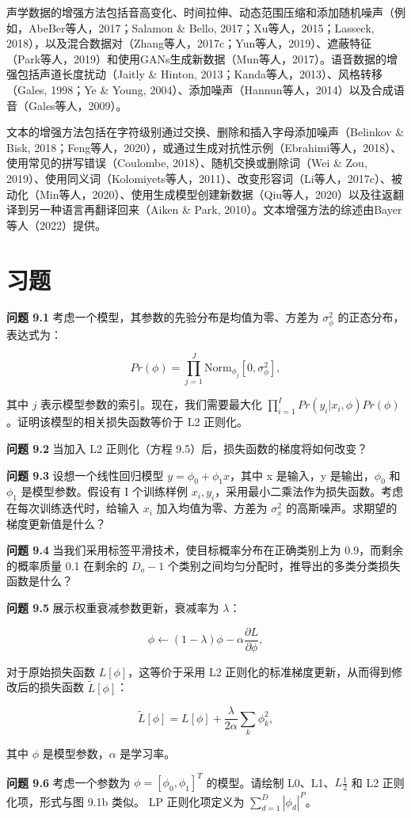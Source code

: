 声学数据的增强方法包括音高变化、时间拉伸、动态范围压缩和添加随机噪声（例如，AbeBer等人，2017；Salamon \& Bello, 2017；Xu等人，2015；Lasseck, 2018），以及混合数据对（Zhang等人，2017c；Yun等人，2019）、遮蔽特征（Park等人，2019）和使用GANs生成新数据（Mun等人，2017）。语音数据的增强包括声道长度扰动（Jaitly \& Hinton, 2013；Kanda等人，2013）、风格转移（Gales, 1998；Ye \& Young, 2004）、添加噪声（Hannun等人，2014）以及合成语音（Gales等人，2009）。

文本的增强方法包括在字符级别通过交换、删除和插入字母添加噪声（Belinkov \& Bisk, 2018；Feng等人，2020），或通过生成对抗性示例（Ebrahimi等人，2018）、使用常见的拼写错误（Coulombe, 2018）、随机交换或删除词（Wei \& Zou, 2019）、使用同义词（Kolomiyets等人，2011）、改变形容词（Li等人，2017c）、被动化（Min等人，2020）、使用生成模型创建新数据（Qiu等人，2020）以及往返翻译到另一种语言再翻译回来（Aiken \& Park, 2010）。文本增强方法的综述由Bayer等人（2022）提供。

\section{习题}
\textbf{问题 9.1} 考虑一个模型，其参数的先验分布是均值为零、方差为 \(\sigma_{\phi}^2\) 的正态分布，表达式为：

\begin{equation}
Pr(\phi) = \prod_{j=1}^{J} \text{Norm}_{\phi_j} [0, \sigma_{\phi}^2], 
\end{equation}

其中 \( j \) 表示模型参数的索引。现在，我们需要最大化 \(\prod_{i=1}^{I} Pr(y_i|x_i, \phi)Pr(\phi)\)。证明该模型的相关损失函数等价于 L2 正则化。

\textbf{问题 9.2} 当加入 L2 正则化（方程 9.5）后，损失函数的梯度将如何改变？

\textbf{问题 9.3} 设想一个线性回归模型 \(y = \phi_0 + \phi_1 x\)，其中 x 是输入，y  是输出，\(\phi_0\) 和 \(\phi_1\) 是模型参数。假设有 I 个训练样例 \({x_i, y_i}\)，采用最小二乘法作为损失函数。考虑在每次训练迭代时，给输入 \(x_i\) 加入均值为零、方差为 \(\sigma_{x}^2\) 的高斯噪声。求期望的梯度更新值是什么？

\textbf{问题 9.4} 当我们采用标签平滑技术，使目标概率分布在正确类别上为 0.9，而剩余的概率质量 0.1 在剩余的 \(D_o - 1\) 个类别之间均匀分配时，推导出的多类分类损失函数是什么？

\textbf{问题 9.5} 展示权重衰减参数更新，衰减率为 \(\lambda\)：

\begin{equation}
\phi \leftarrow (1 - \lambda) \phi - \alpha \frac{\partial L}{\partial \phi}, 
\end{equation}

对于原始损失函数 \(L[\phi]\)，这等价于采用 L2 正则化的标准梯度更新，从而得到修改后的损失函数 \(\tilde{L}[\phi]\)：

\begin{equation}
\tilde{L}[\phi] = L[\phi] + \frac{\lambda}{2\alpha} \sum_{k} \phi_k^2, 
\end{equation}

其中 \(\phi\) 是模型参数，\(\alpha\) 是学习率。

\textbf{问题 9.6} 考虑一个参数为 \(\phi = [\phi_0, \phi_1]^T\) 的模型。请绘制 L0、L1、\(L\frac{1}{2}\) 和 L2 正则化项，形式与图 9.1b 类似。 LP 正则化项定义为 \(\sum_{d=1}^{D} |\phi_d|^P\)。
